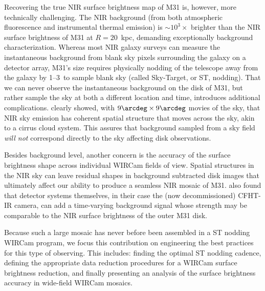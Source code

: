 \documentclass[iop]{emulateapj}
\begin{document}
Recovering the true NIR surface brightness map of M31 is, however, more technically challenging.
The NIR background (from both atmospheric fluorescence and instrumental thermal emission) is $\sim 10^3\times$ brighter than the NIR surface brightness of M31 at $R=20$~kpc, demanding exceptionally background characterization.
Whereas most NIR galaxy surveys can measure the instantaneous background from blank sky pixels surrounding the galaxy on a detector array, M31's size requires physically nodding of the telescope away from the galaxy by 1\arcdeg--3\arcdeg\ to sample blank sky (called Sky-Target, or ST, nodding).
That we can never observe the instantaneous background on the disk of M31, but rather sample the sky at both a different location and time, introduces additional complications.
\cite{Adams:1996} clearly showed, with $9\arcdeg \times 9\arcdeg$ movies of the sky, that NIR sky emission has coherent spatial structure that moves across the sky, akin to a cirrus cloud system.
This assures that background sampled from a sky field \emph{will not} correspond directly to the sky affecting disk observations.

Besides background level, another concern is the accuracy of the surface brightness shape across individual WIRCam fields of view.
Spatial structures in the NIR sky can leave residual shapes in background subtracted disk images that ultimately affect our ability to produce a seamless NIR mosaic of M31.
\cite{Vaduvescu:2004} also found that detector systems themselves, in their case the (now decommissioned) CFHT-IR camera, can add a time-varying background signal whose strength may be comparable to the NIR surface brightness of the outer M31 disk.

Because such a large mosaic has never before been assembled in a ST nodding WIRCam program, we focus this contribution on engineering the best practices for this type of observing.
This includes: finding the optimal ST nodding cadence, defining the appropriate data reduction procedures for a WIRCam surface brightness reduction, and finally presenting an analysis of the surface brightness accuracy in wide-field WIRCam mosaics.
\end{document}

